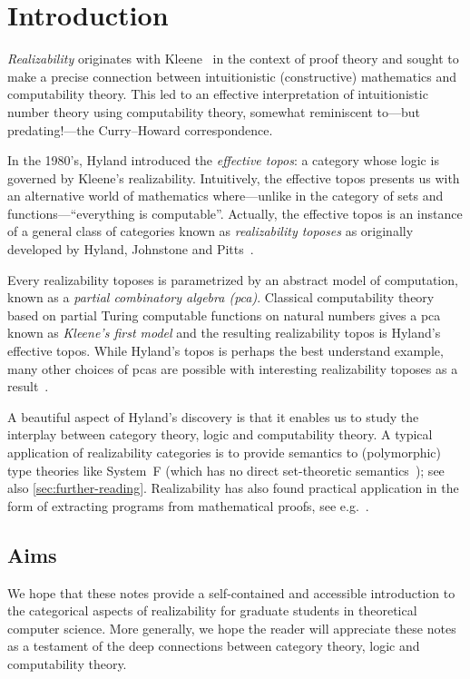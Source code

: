 \chapter{Introduction}

\emph{Realizability} originates with Kleene~\cite{Kleene1945} in the context of
proof theory and sought to make a precise connection between intuitionistic
(constructive) mathematics and computability theory.
%
This led to an effective interpretation of intuitionistic number theory using
computability theory, somewhat reminiscent to---but predating!---the
Curry--Howard correspondence.

In the 1980's, Hyland introduced the \emph{effective topos}: a category whose
logic is governed by Kleene's realizability.
%
Intuitively, the effective topos presents us with an alternative world of
mathematics where---unlike in the category of sets and functions---``everything is
computable''.
%
Actually, the effective topos is an instance of a general class of categories
known as \emph{realizability toposes} as originally developed by Hyland,
Johnstone and Pitts~\cite{HJP1980,Pitts1981}.

Every realizability toposes is parametrized by an abstract model of computation,
known as a \emph{partial combinatory algebra (pca)}. Classical computability
theory based on partial Turing computable functions on natural numbers gives a
pca known as \emph{Kleene's first model} and the resulting realizability topos
is Hyland's effective topos.
%
While Hyland's topos is perhaps the best understand example, many other choices
of pcas are possible with interesting realizability toposes as a
result~\cite{vanOosten2008}.

A beautiful aspect of Hyland's discovery is that it enables us to study the
interplay between category theory, logic and computability theory.
%
A typical application of realizability categories is to provide semantics to
(polymorphic) type theories like System~F (which has no direct set-theoretic
semantics~\cite{Reynolds1984}); see also \cref{sec:further-reading}.
%
Realizability has also found practical application in the form of extracting
programs from mathematical proofs, see e.g.~\cite{Minlog}.

\section{Aims}
We hope that these notes provide a self-contained and accessible introduction to
the categorical aspects of realizability for graduate students in theoretical
computer science.
%
More generally, we hope the reader will appreciate these notes as a testament of
the deep connections between category theory, logic and computability theory.

